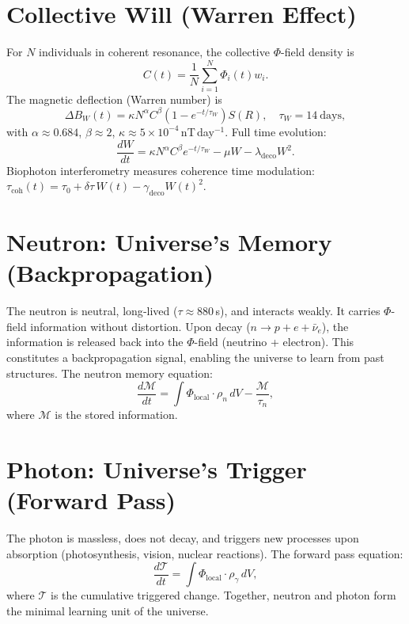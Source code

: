 \documentclass[11pt]{article}
\begin{document}
\section{Collective Will (Warren Effect)}
\label{sec:warren}
For $N$ individuals in coherent resonance, the collective $\Phi$-field density is
\begin{equation}
C(t) = \frac{1}{N} \sum_{i=1}^{N} \Phi_i(t) w_i.
\label{eq:collective_C}
\end{equation}
The magnetic deflection (Warren number) is
\begin{equation}
\Delta B_W(t) = \kappa N^{\alpha} C^{\beta} \left(1 - e^{-t/\tau_W}\right) S(R),\quad \tau_W=14\ \text{days},
\label{eq:warren_basic}
\end{equation}
with $\alpha\approx0.684$, $\beta\approx2$, $\kappa\approx5\times10^{-4}$ nT day$^{-1}$. Full time evolution:
\begin{equation}
\frac{dW}{dt} = \kappa N^{\alpha} C^{\beta} e^{-t/\tau_W} - \mu W - \lambda_{\mathrm{deco}} W^2.
\label{eq:warren_evol}
\end{equation}
Biophoton interferometry measures coherence time modulation: $\tau_{\mathrm{coh}}(t)=\tau_0 + \delta\tau\,W(t) - \gamma_{\mathrm{deco}} W(t)^2$.

\section{Neutron: Universe’s Memory (Backpropagation)}
\label{sec:neutron}
The neutron is neutral, long‑lived ($\tau\approx880$ s), and interacts weakly. It carries $\Phi$-field information without distortion. Upon decay ($n\to p+e+\bar{\nu}_e$), the information is released back into the $\Phi$-field (neutrino + electron). This constitutes a backpropagation signal, enabling the universe to learn from past structures. The neutron memory equation:
\begin{equation}
\frac{d\mathcal{M}}{dt} = \int \Phi_{\mathrm{local}} \cdot \rho_n \, dV - \frac{\mathcal{M}}{\tau_n},
\label{eq:neutron_memory}
\end{equation}
where $\mathcal{M}$ is the stored information.

\section{Photon: Universe’s Trigger (Forward Pass)}
\label{sec:photon}
The photon is massless, does not decay, and triggers new processes upon absorption (photosynthesis, vision, nuclear reactions). The forward pass equation:
\begin{equation}
\frac{d\mathcal{T}}{dt} = \int \Phi_{\mathrm{local}} \cdot \rho_\gamma \, dV,
\label{eq:photon_trigger}
\end{equation}
where $\mathcal{T}$ is the cumulative triggered change. Together, neutron and photon form the minimal learning unit of the universe.
\end{document}
